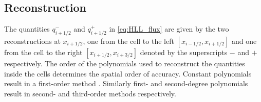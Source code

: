 \documentclass[SingleSpace,12pt,Proceedings]{Serre_ASCE}
\begin{document}
\subsection{Reconstruction} %
The quantities $q^-_{i + 1/2}$ and $q^+_{i + 1/2}$ in \eqref{eq:HLL_flux} are given by the two reconstructions at $x_{i + 1/2}$, one from the cell to the left $[x_{i - 1/2}, x_{i+ 1/2}]$ and one from the cell to the right $[x_{i + 1/2}, x_{i+ 3/2}]$ denoted by the superscripts $-$ and $+$ respectively. The order of the polynomials used to reconstruct the quantities inside the cells determines the spatial order of accuracy. Constant polynomials result in a first-order method \cite{Godunov-1959-271}. Similarly first- and second-degree polynomials result in second- and third-order methods respectively. 
\end{document}
